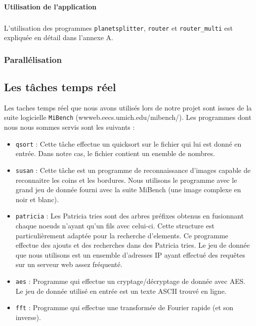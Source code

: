 \paragraph{Utilisation de l'application}
\subparagraph{}

L'utilisation des programmes \texttt{planetsplitter}, \texttt{router} et 
\texttt{router\_multi} est expliquée en détail dans l'annexe A.

\subsubsection{Parallélisation}

\subsection{Les tâches temps réel}

Les taches temps réel que nous avons utilisés lors de notre projet sont issues 
de la suite logicielle \texttt{MiBench} (wwweb.eecs.umich.edu/mibench/). Les 
programmes dont nous nous sommes servis sont les suivants : 

\begin{itemize}
\item \texttt{qsort} : Cette tâche effectue un quicksort sur le fichier qui lui 
est donné en entrée. Dans notre cas, le fichier contient un enemble de nombres.
\item \texttt{susan} : Cette tâche est un programme de reconnaissance d'images 
capable de reconnaitre les coins et les bordures. Nous utilisons le programme 
avec le grand jeu de donnée fourni avec la suite MiBench (une image complexe 
en noir et blanc).
\item \texttt{patricia} : Les Patricia tries sont des arbres préfixes obtenus 
en fusionnant chaque noeuds n'ayant qu'un fils avec celui-ci. Cette structure 
est particulièrement adaptée pour la recherche d'elements. Ce programme effectue
 des ajouts et des recherches dans des Patricia tries. Le jeu de donnée que nous
 utilisons est un ensemble d'adresses IP ayant effectué des requêtes sur un 
serveur web assez fréquenté.
\item \texttt{aes} : Programme qui effectue un cryptage/décryptage de donnée 
avec AES. Le jeu de donnée utilisé en entrée est un texte ASCII trouvé en ligne.
\item \texttt{fft} : Programme qui effectue une transformée de Fourier rapide (et 
son inverse). 
\end{itemize}

